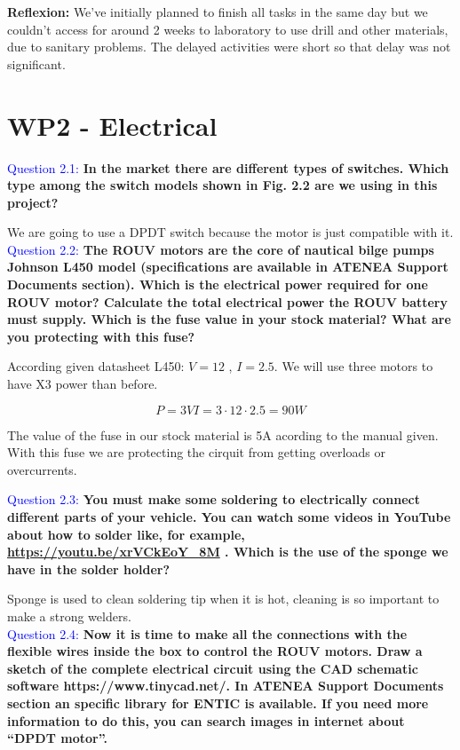 \documentclass[12pt, a4papre]{article}
\begin{document}
	\textbf{Reflexion: }We’ve initially planned to finish all tasks in the same day but we couldn’t access for around 2 weeks to laboratory to use drill and other materials, due to sanitary problems. The delayed activities were short so that delay was not significant.
	
	\newpage
	\section{WP2 - Electrical} 
	
	\textcolor{blue}{Question 2.1:} \textbf{In the market there are different types of switches. Which type among the switch models shown in Fig. 2.2 are we using in this project?}
	
	We are going to use a DPDT switch because the motor is just compatible with it.\\
	
	\textcolor{blue}{Question 2.2:} \textbf{The ROUV motors are the core of nautical bilge pumps Johnson L450 model (specifications are available in ATENEA Support Documents section). Which is the electrical power required for one ROUV motor? Calculate the total electrical power the ROUV battery must supply. Which is the fuse value in your stock material? What are you protecting with this fuse?}
	
	According given datasheet L450: $V=12$ , $I=2.5$. We will use three motors to have X3 power than before.
	
	\[
		P = 3VI = 3\cdot12\cdot 2.5 = 90W
	\]
	
	The value of the fuse in our stock material is 5A acording to the manual given. With this fuse we are protecting the cirquit from getting overloads or overcurrents.

	\textcolor{blue}{Question 2.3:} \textbf{You must make some soldering to electrically connect different parts of your vehicle. You can watch some videos in YouTube about how to solder like, for example, \url{https://youtu.be/xrVCkEoY_8M} . Which is the use of the sponge we have in the solder holder?}
	
	Sponge is used to clean soldering tip when it is hot, cleaning is so important to make a strong welders.\\
	\newpage
	\textcolor{blue}{Question 2.4:} \textbf{Now it is time to make all the connections with the flexible wires inside the box to control the ROUV motors. Draw a sketch of the complete electrical circuit using the CAD schematic software https://www.tinycad.net/. In ATENEA Support Documents section an specific library for ENTIC is available. If you need more information to do this, you can search images in internet about “DPDT motor”.}
	
\end{document}
